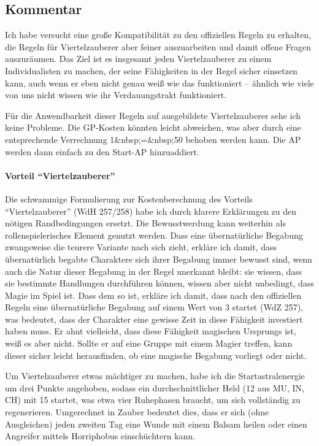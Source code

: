 \subsection{Kommentar}
Ich habe versucht eine große Kompatibilität zu den offiziellen Regeln zu erhalten, die Regeln für Viertelzauberer aber feiner auszuarbeiten und damit offene Fragen auszuräumen. Das Ziel ist es insgesamt jeden Viertelzauberer zu einem Individualisten zu machen, der seine Fähigkeiten in der Regel sicher einsetzen kann, auch wenn er eben nicht genau weiß wie das funktioniert -- ähnlich wie viele von uns nicht wissen wie ihr Verdauungstrakt funktioniert.

Für die Anwendbarkeit dieser Regeln auf ausgebildete Viertelzauberer sehe ich keine Probleme. Die GP-Kosten könnten leicht abweichen, was aber durch eine entsprechende Verrechnung \SI{1}{\GP}&nbsp;=&nbsp;\SI{50}{\AP} behoben werden kann. Die AP werden dann einfach zu den Start-AP hinzuaddiert.

\paragraph{Vorteil \enquote{Viertelzauberer}}
Die schwammige Formulierung zur Kostenberechnung des Vorteils \enquote{Viertelzauberer} (WdH 257/258) habe ich durch klarere Erklärungen zu den nötigen Randbedingungen ersetzt. Die Bewusstwerdung kann weiterhin als rollenspielerisches Element genutzt werden. Dass eine übernatürliche Begabung zwangsweise die teurere Variante nach sich zieht, erkläre ich damit, dass übernatürlich begabte Charaktere sich ihrer Begabung immer bewusst sind, wenn auch die Natur dieser Begabung in der Regel unerkannt bleibt: sie wissen, dass sie bestimmte Handlungen durchführen können, wissen aber nicht unbedingt, dass Magie im Spiel ist. Dass dem so ist, erkläre ich damit, dass nach den offiziellen Regeln eine übernatürliche Begabung auf einem Wert von 3 startet (WdZ 257), was bedeutet, dass der Charakter eine gewisse Zeit in diese Fähigkeit investiert haben muss. Er ahnt vielleicht, dass diese Fähigkeit magischen Ursprungs ist, weiß es aber nicht. Sollte er auf eine Gruppe mit einem Magier treffen, kann dieser sicher leicht herausfinden, ob eine magische Begabung vorliegt oder nicht.

Um Viertelzauberer etwas mächtiger zu machen, habe ich die Startastralenergie um drei Punkte angehoben, sodass ein durchschnittlicher Held (12 aus MU, IN, CH) mit \SI{15}{\AsP} startet, was etwa vier Ruhephasen braucht, um sich vollständig zu regenerieren. Umgerechnet in Zauber bedeutet dies, dass er sich (ohne Ausgleichen) jeden zweiten Tag eine Wunde mit einem Balsam heilen oder einen Angreifer mittels Horriphobus einschüchtern kann.

